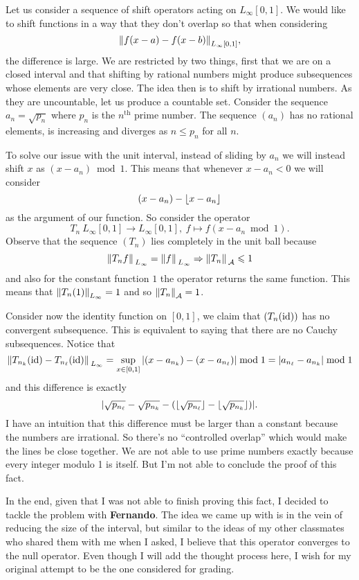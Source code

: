 \documentclass[12pt]{memoir}
\begin{document}
\begin{ptcbr}%
    Let us consider a sequence of shift operators acting on $L_\infty[0,1]$. We would like to shift functions in a way that they don't overlap so that when considering 
    $$\norm{f(x-a)-f(x-b)}_{L_\infty[0,1]},$$
    the difference is large. We are restricted by two things, first that we are on a closed interval and that shifting by rational numbers might produce subsequences whose elements are very close. The idea then is to shift by irrational numbers. As they are uncountable, let us produce a countable set. Consider the sequence $a_n=\sqrt{p_n}$ where $p_n$ is the $n^{\text{th}}$ prime number. The sequence $(a_n)$ has no rational elements, is increasing and diverges as $n\leq p_n$ for all $n$.\par 
    To solve our issue with the unit interval, instead of sliding by $a_n$ we will instead shift $x$ as $(x-a_n)\bmod 1$. This means that whenever $x-a_n<0$ we will consider 
    $$(x-a_n)-\lfloor x-a_n\rfloor$$
    as the argument of our function. So consider the operator 
    $$T_n\: L_\infty[0,1]\to L_\infty[0,1],\ f\mapsto f(x-a_n\bmod 1).$$
    Observe that the sequence $(T_n)$ lies completely in the unit ball because 
    $$\norm*{T_nf}_{L_\infty}=\norm*{f}_{L_\infty}\Rightarrow \norm*{T_n}_{\mathcal{A}}\leqslant 1$$
    and also for the constant function $1$ the operator returns the same function. This means that $\norm{T_n(1)}_{L_\infty}=1$ and so $\norm{T_n}_{\mathcal{A}}=1$.\par
    Consider now the identity function on $[0,1]$, we claim that $(T_n(\operatorname{id}))$ has no convergent subsequence. This is equivalent to saying that there are no Cauchy subsequences. Notice that 
    $$\norm*{T_{n_k}(\operatorname{id})-T_{n_\ell}(\operatorname{id})}_{L_\infty}=\sup_{x\in[0,1]}|(x-a_{n_k})-(x-a_{n_\ell})|\bmod 1=|a_{n_\ell}-a_{n_k}|\bmod 1$$
    and this difference is exactly 
    $$|\sqrt{p_{n_\ell}}-\sqrt{p_{n_k}}-(\lfloor\sqrt{p_{n_\ell}}\rfloor-\lfloor\sqrt{p_{n_k}}\rfloor)|.$$
    I have an intuition that this difference must be larger than a constant because the numbers are irrational. So there's no ``controlled overlap'' which would make the lines be close together. We are not able to use prime numbers exactly because every integer modulo 1 is itself. But I'm not able to conclude the proof of this fact.
\end{ptcbr}

In the end, given that I was not able to finish proving this fact, I decided to tackle the problem with \textbf{Fernando}. The idea we came up with is in the vein of reducing the size of the interval, but similar to the ideas of my other classmates who shared them with me when I asked, I believe that this operator converges to the null operator. Even though I will add the thought process here, I wish for my original attempt to be the one considered for grading.
\end{document}

